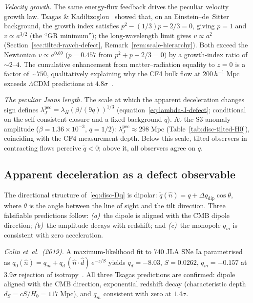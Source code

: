 \emph{Velocity growth.}
The same energy-flux feedback drives the peculiar velocity
growth law.  Tsagas \& Kadiltzoglou~\cite{TsagasKadiltzoglou2013}
showed that, on an Einstein--de~Sitter background, the growth
index satisfies $p^2 - (1/3)p - 2/3 = 0$, giving $p = 1$ and
$v \propto a^{3/2}$ (the ``GR minimum''); the
long-wavelength limit gives $v \propto a^2$
(Section~\ref{sec:tilted-raych-defect},
Remark~\ref{rem:scale-hierarchy}).
Both exceed the Newtonian $v \propto a^{0.69}$
($p = 0.457$ from $p^2 + p - 2/3 = 0$) by a growth-index
ratio of $\sim\!2$--$4$.  The cumulative enhancement from
matter--radiation equality to $z = 0$ is a factor of
$\sim\!750$, qualitatively explaining why the CF4 bulk flow at
$200\,h^{-1}\;\mathrm{Mpc}$ exceeds $\Lambda$CDM predictions
at $4.8\sigma$~\cite{Watkins2023}.

\emph{The peculiar Jeans length.}
The scale at which the apparent deceleration changes sign defines
$\lambda_J^{\mathrm{pec}}
= \lambda_H(\beta/(9q))^{1/3}$
(equation~\eqref{eq:lambda-J-defect}; conditional on the
self-consistent closure and a fixed background $q$).  At the S3 anomaly
amplitude ($\beta = 1.36 \times 10^{-3}$, $q = 1/2$):
$\lambda_J^{\mathrm{pec}} \approx 298\;\mathrm{Mpc}$
(Table~\ref{tab:disc-tilted-H0}), coinciding with the CF4 measurement
depth.  Below this scale, tilted observers in contracting flows
perceive $\tilde{q} < 0$; above it, all observers agree on $q$.


\subsection{Apparent deceleration as a defect observable}
\label{sec:disc-apparent-q}

The directional structure of~\eqref{eq:disc-Dq} is dipolar:
$\tilde{q}(\hat{n}) = q + \Delta q_{\mathrm{dip}}\cos\theta$,
where $\theta$ is the angle between the line of sight and the
tilt direction.  Three falsifiable predictions follow:
\emph{(a)}~the dipole is aligned with the CMB dipole direction;
\emph{(b)}~the amplitude decays with redshift; and
\emph{(c)}~the monopole $q_m$ is consistent with zero
acceleration.

\emph{Colin et~al.\ (2019).}
A maximum-likelihood fit to 740 JLA SNe Ia parametrised as
$q_0(\hat{n}) = q_m + q_d\,(\hat{n}\cdot\hat{d})\,e^{-z/S}$
yields $q_d = -8.03$, $S = 0.0262$, $q_m = -0.157$ at
$3.9\sigma$ rejection of isotropy~\cite{Colin2019}.  All three
Tsagas predictions are confirmed: dipole aligned with the CMB
direction, exponential redshift decay (characteristic depth
$d_S = cS/H_0 = 117\;\mathrm{Mpc}$), and $q_m$ consistent with
zero at $1.4\sigma$.

